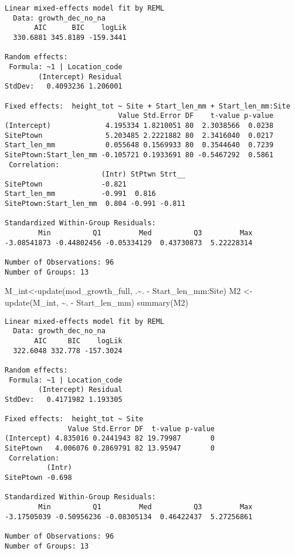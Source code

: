 \documentclass[
  letterpaper,
  DIV=11,
  numbers=noendperiod]{scrartcl}
\newenvironment{Shaded}{\begin{snugshade}}{\end{snugshade}}
\newcommand{\FunctionTok}[1]{\textcolor[rgb]{0.28,0.35,0.67}{#1}}
\newcommand{\NormalTok}[1]{\textcolor[rgb]{0.00,0.23,0.31}{#1}}
\newcommand{\OtherTok}[1]{\textcolor[rgb]{0.00,0.23,0.31}{#1}}
\newcommand{\SpecialCharTok}[1]{\textcolor[rgb]{0.37,0.37,0.37}{#1}}
\begin{document}
\begin{verbatim}
Linear mixed-effects model fit by REML
  Data: growth_dec_no_na 
       AIC      BIC    logLik
  330.6881 345.8189 -159.3441

Random effects:
 Formula: ~1 | Location_code
        (Intercept) Residual
StdDev:   0.4093236 1.206001

Fixed effects:  height_tot ~ Site + Start_len_mm + Start_len_mm:Site 
                           Value Std.Error DF    t-value p-value
(Intercept)             4.195334 1.8210051 80  2.3038566  0.0238
SitePtown               5.203485 2.2221882 80  2.3416040  0.0217
Start_len_mm            0.055648 0.1569933 80  0.3544640  0.7239
SitePtown:Start_len_mm -0.105721 0.1933691 80 -0.5467292  0.5861
 Correlation: 
                       (Intr) StPtwn Strt__
SitePtown              -0.821              
Start_len_mm           -0.991  0.816       
SitePtown:Start_len_mm  0.804 -0.991 -0.811

Standardized Within-Group Residuals:
        Min          Q1         Med          Q3         Max 
-3.08541873 -0.44802456 -0.05334129  0.43730873  5.22228314 

Number of Observations: 96
Number of Groups: 13 
\end{verbatim}

\begin{Shaded}
\begin{Highlighting}[]
\NormalTok{M\_int}\OtherTok{\textless{}{-}}\FunctionTok{update}\NormalTok{(mod\_growth\_full, .}\SpecialCharTok{\textasciitilde{}}\NormalTok{. }\SpecialCharTok{{-}}\NormalTok{ Start\_len\_mm}\SpecialCharTok{:}\NormalTok{Site)}
\NormalTok{M2 }\OtherTok{\textless{}{-}} \FunctionTok{update}\NormalTok{(M\_int, }\SpecialCharTok{\textasciitilde{}}\NormalTok{. }\SpecialCharTok{{-}}\NormalTok{ Start\_len\_mm)}
\FunctionTok{summary}\NormalTok{(M2)}
\end{Highlighting}
\end{Shaded}

\begin{verbatim}
Linear mixed-effects model fit by REML
  Data: growth_dec_no_na 
       AIC     BIC    logLik
  322.6048 332.778 -157.3024

Random effects:
 Formula: ~1 | Location_code
        (Intercept) Residual
StdDev:   0.4171982 1.193305

Fixed effects:  height_tot ~ Site 
               Value Std.Error DF  t-value p-value
(Intercept) 4.835016 0.2441943 82 19.79987       0
SitePtown   4.006076 0.2869791 82 13.95947       0
 Correlation: 
          (Intr)
SitePtown -0.698

Standardized Within-Group Residuals:
        Min          Q1         Med          Q3         Max 
-3.17505039 -0.50956236 -0.08305134  0.46422437  5.27256861 

Number of Observations: 96
Number of Groups: 13 
\end{verbatim}
\end{document}
